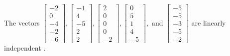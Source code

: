 \begin{exercise}
\begin{exerciseStatement}
  \end{exerciseStatement}
  \begin{exerciseAnswer}
   The vectors \(\left[\begin{array}{r}
-2 \\
0 \\
-4 \\
-2 \\
-6
\end{array}\right] , \left[\begin{array}{r}
-1 \\
4 \\
-5 \\
2 \\
2
\end{array}\right] , \left[\begin{array}{r}
2 \\
0 \\
0 \\
0 \\
-2
\end{array}\right] , \left[\begin{array}{r}
0 \\
5 \\
1 \\
4 \\
-5
\end{array}\right] , \text{ and } \left[\begin{array}{r}
-5 \\
-5 \\
-3 \\
-5 \\
-2
\end{array}\right]\) are 
  	 linearly independent  .
  


  \end{exerciseAnswer}
\end{exercise}